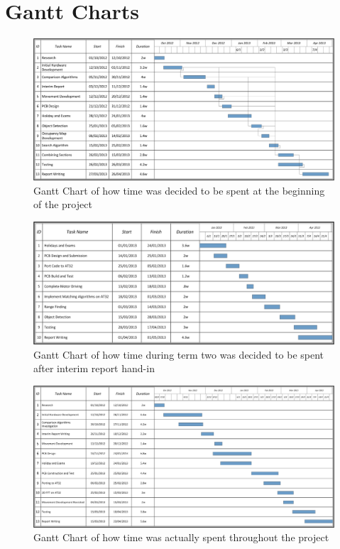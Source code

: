 \chapter{Gantt Charts} \label{Chapter:AppendixD:Gannt}

\begin{figure}
\centering
\includegraphics[angle = 90,height=\textheight-7cm]{Figures/Gantt.jpg} 
\caption{Gantt Chart of how time was decided to be spent at the beginning of the project}
\label{fig:Gantt:1}
\end{figure}
\clearpage
\begin{figure}
\centering
\includegraphics[angle = 90, height=\textheight-7cm]{Figures/Gantt2.jpg} 
\caption{Gantt Chart of how time during term two was decided to be spent after interim report hand-in}
\label{fig:Gantt:2}
\end{figure}

\begin{figure}
\centering
\includegraphics[angle = 90, height=\textheight-7cm]{Figures/Gantt3.jpg} 
\caption{Gantt Chart of how time was actually spent throughout the project}
\label{fig:Gantt:3}
\end{figure}